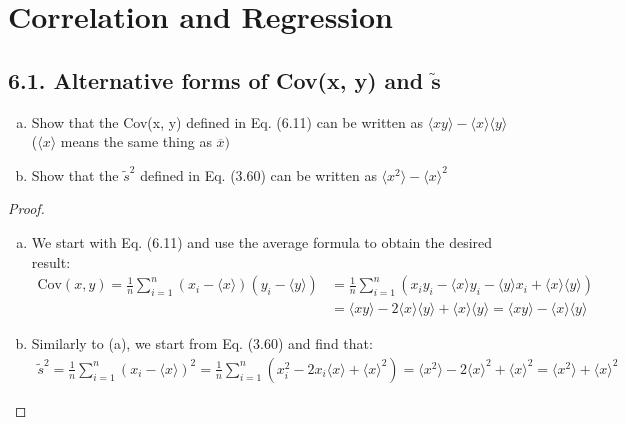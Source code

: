 \chapter{Correlation and Regression}

\section*{6.1. Alternative forms of Cov(x, y) and $\bm{\widetilde{s}}$}
\begin{enumerate}[(a)]
    \item Show that the Cov(x, y) defined in Eq. (6.11) can be written
        as  $\langle xy \rangle - \langle x \rangle \langle y \rangle$ 
        ($\langle x \rangle$ means the same thing as $\overline{x})$

    \item Show that the $\widetilde{s}^2$ defined in Eq. (3.60) can be
        written  as $\langle x^2 \rangle - \langle x \rangle^2$
\end{enumerate}

\vspace{1em}
\begin{proof}
    \hfill
    \begin{enumerate}[(a)]
        \item We start with Eq. (6.11) and use the average formula to obtain the desired result:
            \begin{align*}
                \text{Cov}(x, y) 
                = \frac{1}{n} \sum_{i = 1}^n (x_i - \langle x \rangle)(y_i - \langle y \rangle)
                &= \frac{1}{n} \sum_{i = 1}^n (x_iy_i - \langle x \rangle y_i - \langle y \rangle x_i +  
                    \langle x \rangle \langle y \rangle) \\
                &= \langle xy \rangle - 2 \langle x \rangle \langle y \rangle 
                    + \langle x \rangle \langle y \rangle
                = \langle xy \rangle - \langle x \rangle \langle y \rangle
            \end{align*}

        \item Similarly to (a), we start from Eq. (3.60) and find that:
            \begin{align*}
                \widetilde{s}^2 
                = \frac{1}{n} \sum_{i = 1}^n (x_i - \langle x \rangle)^2
                = \frac{1}{n} \sum_{i = 1}^n (x_i^2 - 2x_i \langle x \rangle + \langle x \rangle^2)
                = \langle x^2 \rangle - 2\langle x \rangle^2 + \langle x \rangle^2
                = \langle x^2 \rangle + \langle x \rangle^2 
            \end{align*}
    \end{enumerate}
\end{proof}

